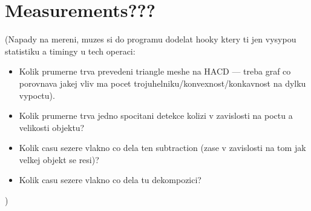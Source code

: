 \section{Measurements???}

(Napady na mereni, muzes si do programu dodelat hooky ktery ti jen vysypou statistiku a timingy u tech operaci:
\begin{itemize}
\item Kolik prumerne trva prevedeni triangle meshe na HACD --- treba graf co porovnava jakej vliv ma pocet trojuhelniku/konvexnost/konkavnost na dylku vypoctu).
\item Kolik prumerne trva jedno spocitani detekce kolizi v zavislosti na poctu a velikosti objektu?
\item Kolik casu sezere vlakno co dela ten subtraction (zase v zavislosti na tom jak velkej objekt se resi)?
\item Kolik casu sezere vlakno co dela tu dekompozici?
\end{itemize})

